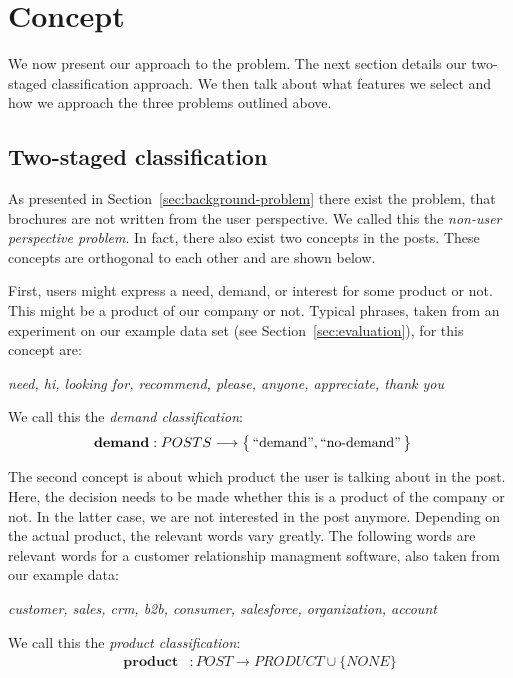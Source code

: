 \section{Concept}
\label{sec:concept}
We now present our approach to the \nto problem.
The next section details our two-staged classification approach.
We then talk about what features we select and how we approach the three problems outlined above.

\subsection{Two-staged classification}
As presented in Section~\ref{sec:background-problem} there exist the problem, that brochures are not written from the user perspective.
We called this the \emph{non-user perspective problem}.
In fact, there also exist two concepts in the posts.
These concepts are orthogonal to each other and are shown below.

First, users might express a need, demand, or interest for some product or not.
This might be a product of our company or not.
Typical phrases, taken from an experiment on our example data set (see Section~\ref{sec:evaluation}), for this concept are:
\begin{center}
	\textit{need, hi, looking for, recommend, please, anyone, appreciate, thank you}
\end{center}
We call this the \emph{demand classification}:
\begin{align*}
	\mathbf{demand}&: POSTS \longrightarrow \big\{ \operatorname{``demand''}, \operatorname{``no-demand''} \big\}
\end{align*}

The second concept is about which product the user is talking about in the post.
Here, the decision needs to be made whether this is a product of the company or not.
In the latter case, we are not interested in the post anymore.
Depending on the actual product, the relevant words vary greatly.
The following words are relevant words for a customer relationship managment software, also taken from our example data:
\begin{center}
	\textit{customer, sales, crm, b2b, consumer, salesforce, organization, account}
\end{center}

We call this the \emph{product classification}:
\begin{align*}
	\mathbf{product}&: POST \longrightarrow  PRODUCT \cup \big\{ NONE \big\}
\end{align*}

